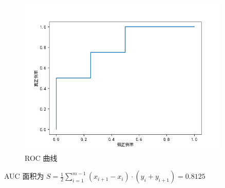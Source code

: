 \documentclass[answers]{exam}  %
\begin{document}
\begin{questions}
\begin{solution}
\begin{enumerate}
            \begin{figure}[H]
              \centering
              \includegraphics[width=0.9\textwidth]{Figure_2.png}
              \caption{ROC 曲线}
              \label{Fig.main1}
            \end{figure}

            AUC 面积为 $S = \frac{1}{2}\sum_{i=1}^{m-1} (x_{i+1}-x_{i})\cdot (y_{i} + y_{i+1}) = 0.8125$
    \end{enumerate}
  \end{solution}

\end{questions}
\end{document}
